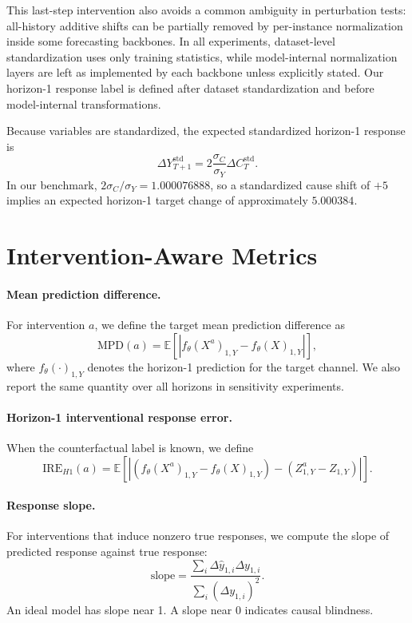 \documentclass{article}
\newcommand{\ire}{\ensuremath{\mathrm{IRE}}}
\newcommand{\mpd}{\ensuremath{\mathrm{MPD}}}
\begin{document}
This last-step intervention also avoids a common ambiguity in perturbation tests:
all-history additive shifts can be partially removed by per-instance normalization
inside some forecasting backbones. In all experiments, dataset-level standardization
uses only training statistics, while model-internal normalization layers are left as
implemented by each backbone unless explicitly stated. Our horizon-1 response label
is defined after dataset standardization and before model-internal transformations.

Because variables are standardized, the expected standardized horizon-1 response is
\begin{equation}
\Delta Y^{\mathrm{std}}_{T+1}
= 2 \frac{\sigma_C}{\sigma_Y} \Delta C^{\mathrm{std}}_T.
\label{eq:scaled_response}
\end{equation}
In our benchmark, $2\sigma_C/\sigma_Y = 1.000076888$, so a standardized cause shift
of $+5$ implies an expected horizon-1 target change of approximately $5.000384$.

\section{Intervention-Aware Metrics}

\paragraph{Mean prediction difference.}
For intervention $a$, we define the target mean prediction difference as
\begin{equation}
\mpd(a) =
\mathbb{E}\left[
\left| f_\theta(X^a)_{1,Y} - f_\theta(X)_{1,Y} \right|
\right],
\end{equation}
where $f_\theta(\cdot)_{1,Y}$ denotes the horizon-1 prediction for the target channel.
We also report the same quantity over all horizons in sensitivity experiments.

\paragraph{Horizon-1 interventional response error.}
When the counterfactual label is known, we define
\begin{equation}
\ire_{H1}(a) =
\mathbb{E}\left[
\left|
\left(f_\theta(X^a)_{1,Y} - f_\theta(X)_{1,Y}\right)
-
\left(Z^a_{1,Y} - Z_{1,Y}\right)
\right|
\right].
\end{equation}

\paragraph{Response slope.}
For interventions that induce nonzero true responses, we compute the slope of predicted
response against true response:
\begin{equation}
\mathrm{slope}
=
\frac{\sum_i \Delta \hat{y}_{1,i} \Delta y_{1,i}}{\sum_i (\Delta y_{1,i})^2}.
\end{equation}
An ideal model has slope near 1. A slope near 0 indicates causal blindness.
\end{document}
